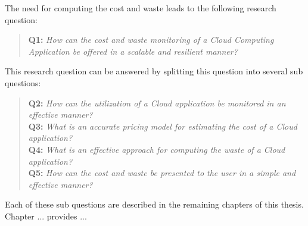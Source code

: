 \noindent
The need for computing the cost and waste leads to the following research question:

\begin{quote}
\textbf{Q1: }\textit{How can the cost and waste monitoring of a Cloud Computing Application be offered in a scalable and resilient manner?}
\end{quote}
\noindent
This research question can be answered by splitting this question into several sub questions:

\begin{quote}
    \textbf{Q2: }\textit{How can the utilization of a Cloud application be monitored in an effective manner?}\\
    \textbf{Q3: }\textit{What is an accurate pricing model for estimating the cost of a Cloud application?}\\
    \textbf{Q4: }\textit{What is an effective approach for computing the waste of a Cloud application?}\\
    \textbf{Q5: }\textit{How can the cost and waste be presented to the user in a simple and effective manner?}\\
\end{quote}

\noindent
Each of these sub questions are described in the remaining chapters of this thesis. Chapter ... provides ... 
